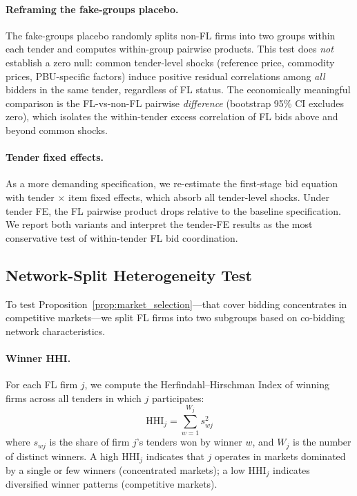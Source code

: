 \paragraph{Reframing the fake-groups placebo.}
The fake-groups placebo randomly splits non-FL firms into two groups
within each tender and computes within-group pairwise products. This
test does \emph{not} establish a zero null: common tender-level shocks
(reference price, commodity prices, PBU-specific factors) induce
positive residual correlations among \emph{all} bidders in the same
tender, regardless of FL status. The economically meaningful comparison
is the FL-vs-non-FL pairwise \emph{difference} (bootstrap 95\% CI
excludes zero), which isolates the within-tender excess correlation of
FL bids above and beyond common shocks.

\paragraph{Tender fixed effects.}
As a more demanding specification, we re-estimate the first-stage bid
equation with tender $\times$ item fixed effects, which absorb all
tender-level shocks. Under tender FE, the FL pairwise product drops
relative to the baseline specification. We report both variants and
interpret the tender-FE results as the most conservative test of
within-tender FL bid coordination.


\subsection{Network-Split Heterogeneity Test} %
\label{sec:empirical_network}

To test Proposition~\ref{prop:market_selection}---that cover bidding
concentrates in competitive markets---we split FL firms into two
subgroups based on co-bidding network characteristics.

\paragraph{Winner HHI.}
For each FL firm $j$, we compute the Herfindahl--Hirschman Index of
winning firms across all tenders in which $j$ participates:
\begin{equation}
  \text{HHI}_j = \sum_{w=1}^{W_j} s_{wj}^2
  \label{eq:winner_hhi}
\end{equation}
where $s_{wj}$ is the share of firm $j$'s tenders won by winner $w$,
and $W_j$ is the number of distinct winners. A high $\text{HHI}_j$
indicates that $j$ operates in markets dominated by a single or few
winners (concentrated markets); a low $\text{HHI}_j$ indicates
diversified winner patterns (competitive markets).

